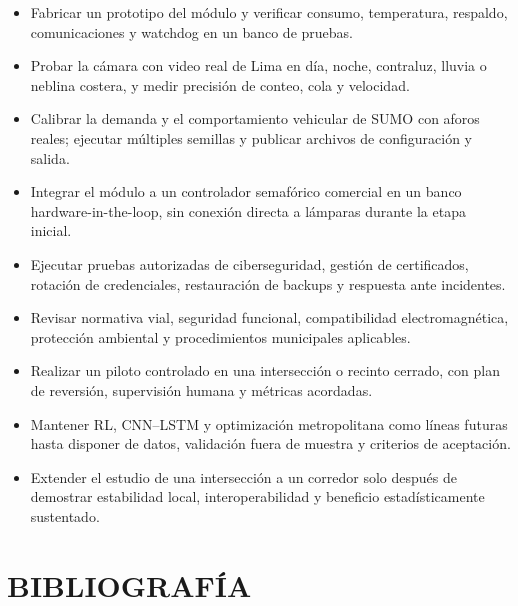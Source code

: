 \documentclass[12pt,a4paper,oneside]{report}
\begin{document}
\begin{itemize}
\item Fabricar un prototipo del módulo y verificar consumo, temperatura, respaldo, comunicaciones y watchdog en un banco de pruebas.
\item Probar la cámara con video real de Lima en día, noche, contraluz, lluvia o neblina costera, y medir precisión de conteo, cola y velocidad.
\item Calibrar la demanda y el comportamiento vehicular de SUMO con aforos reales; ejecutar múltiples semillas y publicar archivos de configuración y salida.
\item Integrar el módulo a un controlador semafórico comercial en un banco hardware-in-the-loop, sin conexión directa a lámparas durante la etapa inicial.
\item Ejecutar pruebas autorizadas de ciberseguridad, gestión de certificados, rotación de credenciales, restauración de backups y respuesta ante incidentes.
\item Revisar normativa vial, seguridad funcional, compatibilidad electromagnética, protección ambiental y procedimientos municipales aplicables.
\item Realizar un piloto controlado en una intersección o recinto cerrado, con plan de reversión, supervisión humana y métricas acordadas.
\item Mantener RL, CNN--LSTM y optimización metropolitana como líneas futuras hasta disponer de datos, validación fuera de muestra y criterios de aceptación.
\item Extender el estudio de una intersección a un corredor solo después de demostrar estabilidad local, interoperabilidad y beneficio estadísticamente sustentado.
\end{itemize}

\chapter*{BIBLIOGRAFÍA}\label{bibliografuxeda}
\end{document}
